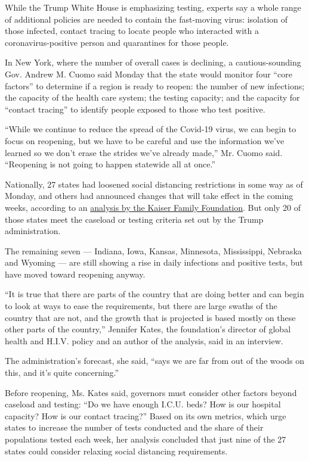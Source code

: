 While the Trump White House is emphasizing testing, experts say a whole
range of additional policies are needed to contain the fast-moving
virus: isolation of those infected, contact tracing to locate people who
interacted with a coronavirus-positive person and quarantines for those
people.

In New York, where the number of overall cases is declining, a
cautious-sounding Gov. Andrew M. Cuomo said Monday that the state would
monitor four ``core factors'' to determine if a region is ready to
reopen: the number of new infections; the capacity of the health care
system; the testing capacity; and the capacity for ``contact tracing''
to identify people exposed to those who test positive.

``While we continue to reduce the spread of the Covid-19 virus, we can
begin to focus on reopening, but we have to be careful and use the
information we've learned so we don't erase the strides we've already
made,'' Mr. Cuomo said. ``Reopening is not going to happen statewide all
at once.''

Nationally, 27 states had loosened social distancing restrictions in
some way as of Monday, and others had announced changes that will take
effect in the coming weeks, according to an
\href{https://www.kff.org/coronavirus-policy-watch/lifting-social-distancing-measures-in-america-state-actions-metrics/}{analysis
by the Kaiser Family Foundation}. But only 20 of those states meet the
caseload or testing criteria set out by the Trump administration.

The remaining seven --- Indiana, Iowa, Kansas, Minnesota, Mississippi,
Nebraska and Wyoming --- are still showing a rise in daily infections
and positive tests, but have moved toward reopening anyway.

``It is true that there are parts of the country that are doing better
and can begin to look at ways to ease the requirements, but there are
large swaths of the country that are not, and the growth that is
projected is based mostly on these other parts of the country,''
Jennifer Kates, the foundation's director of global health and H.I.V.
policy and an author of the analysis, said in an interview.

The administration's forecast, she said, ``says we are far from out of
the woods on this, and it's quite concerning.''

Before reopening, Ms. Kates said, governors must consider other factors
beyond caseload and testing: ``Do we have enough I.C.U. beds? How is our
hospital capacity? How is our contact tracing?'' Based on its own
metrics, which urge states to increase the number of tests conducted and
the share of their populations tested each week, her analysis concluded
that just nine of the 27 states could consider relaxing social
distancing requirements.

